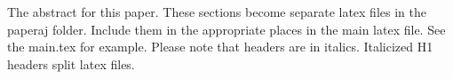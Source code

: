 
The abstract for this paper. These sections become separate latex files in the paperaj folder. Include them in the appropriate places in the main latex file. See the main.tex for example. Please note that headers are in italics. Italicized H1 headers split latex files. 



